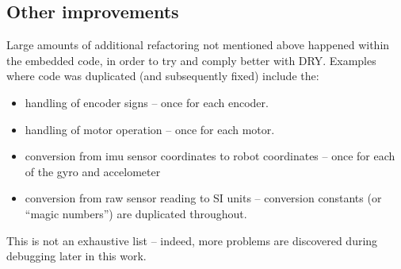 \documentclass[main.tex]{subfiles}
\begin{document}
\subsection{Other improvements}
	Large amounts of additional refactoring not mentioned above happened within the embedded code, in order to try and comply better with DRY.
	Examples where code was duplicated (and subsequently fixed) include the:
	\begin{itemize}[noitemsep]
		\item handling of encoder signs -- once for each encoder.
		\item handling of motor operation -- once for each motor.
		\item conversion from imu sensor coordinates to robot coordinates -- once for each of the gyro and accelometer
		\item conversion from raw sensor reading to SI units -- conversion constants (or \enquote{magic numbers}) are duplicated throughout.
	\end{itemize}
	This is not an exhaustive list -- indeed, more problems are discovered during debugging later in this work.

\bib
\end{document}
